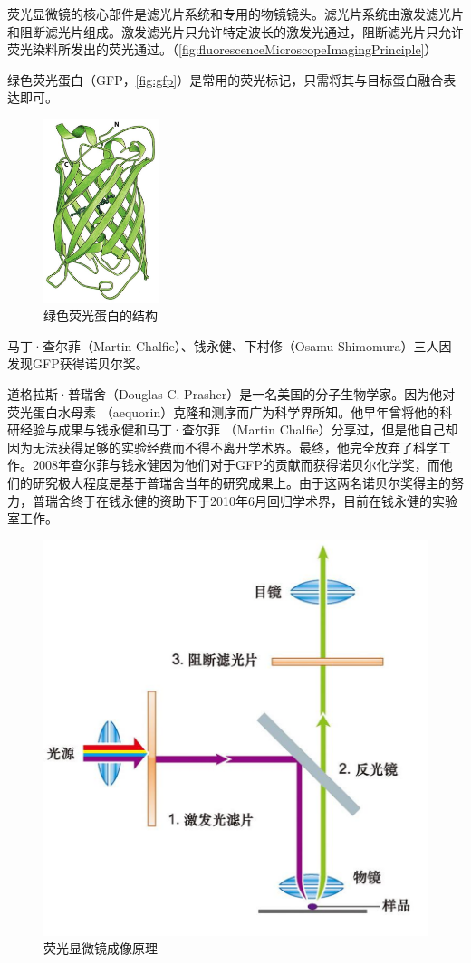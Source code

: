 荧光显微镜的核心部件是滤光片系统和专用的物镜镜头。滤光片系统由激发滤光片和阻断滤光片组成。激发滤光片只允许特定波长的激发光通过，阻断滤光片只允许荧光染料所发出的荧光通过。（\autoref{fig:fluorescenceMicroscopeImagingPrinciple}）

绿色荧光蛋白（GFP，\autoref{fig:gfp}）是常用的荧光标记，只需将其与目标蛋白融合表达即可。

\begin{figure}[htbp]
	\centering
	\includegraphics[width=0.3\textwidth]{Pics/GFP}
	\caption{绿色荧光蛋白的结构}
	\label{fig:gfp}
\end{figure}

\begin{gs}[：GFP与诺贝尔奖]

	\hspace{2em}马丁·查尔菲（Martin Chalfie）、钱永健、下村修（Osamu Shimomura）三人因发现GFP获得诺贝尔奖。

	\hspace{2em}道格拉斯·普瑞舍（Douglas C. Prasher）是一名美国的分子生物学家。因为他对荧光蛋白水母素 （aequorin）克隆和测序而广为科学界所知。他早年曾将他的科研经验与成果与钱永健和马丁·查尔菲 （Martin Chalfie）分享过，但是他自己却因为无法获得足够的实验经费而不得不离开学术界。最终，他完全放弃了科学工作。2008年查尔菲与钱永健因为他们对于GFP的贡献而获得诺贝尔化学奖，而他们的研究极大程度是基于普瑞舍当年的研究成果上。由于这两名诺贝尔奖得主的努力，普瑞舍终于在钱永健的资助下于2010年6月回归学术界，目前在钱永健的实验室工作。
\end{gs}

\begin{figure}[htbp]
	\centering
	\includegraphics[width=0.4\linewidth]{Pics/荧光显微镜成像原理}
	\caption{荧光显微镜成像原理}
	\label{fig:fluorescenceMicroscopeImagingPrinciple}
\end{figure}

